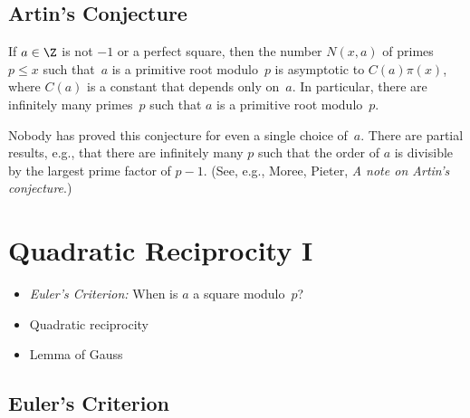 \documentclass[11pt]{report}
\begin{document}
\section{Artin's Conjecture}
\begin{conjecture}
  If $a\in\Z$ is not $-1$ or a perfect square, then
  the number $N(x,a)$ of primes $p\leq x$ such that~$a$
  is a primitive root modulo~$p$ is asymptotic to $C(a)\pi(x)$,
  where $C(a)$ is a constant that depends only on~$a$.
  In particular, there are infinitely many primes~$p$ such
  that $a$ is a primitive root modulo~$p$.
\end{conjecture}
Nobody has proved this conjecture for even a single choice of~$a$.
There are partial results, e.g., that there are infinitely
many $p$ such that the order of $a$ is divisible by the largest
prime factor of $p-1$. (See, e.g., Moree, Pieter, {\em
    A note on {A}rtin's conjecture}.)





\chapter{Quadratic Reciprocity I}



\begin{itemize}
  \item {\em Euler's Criterion:} When is $a$ a square modulo~$p$?
  \item Quadratic reciprocity
  \item Lemma of Gauss
\end{itemize}

\section{Euler's Criterion}
\end{document}
